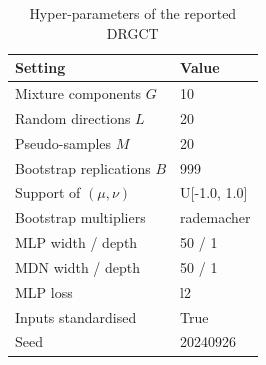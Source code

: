 \begin{table}[htbp]
\centering
\caption{Hyper-parameters of the reported DRGCT}
\label{tab:hyper}
\small
\begin{tabular}{ll}
\toprule
Setting & Value \\
\midrule
Mixture components $G$ & 10 \\
Random directions $L$ & 20 \\
Pseudo-samples $M$ & 20 \\
Bootstrap replications $B$ & 999 \\
Support of $(\mu,\nu)$ & U[-1.0, 1.0] \\
Bootstrap multipliers & rademacher \\
MLP width / depth & 50 / 1 \\
MDN width / depth & 50 / 1 \\
MLP loss & l2 \\
Inputs standardised & True \\
Seed & 20240926 \\
\bottomrule
\end{tabular}
\end{table}
